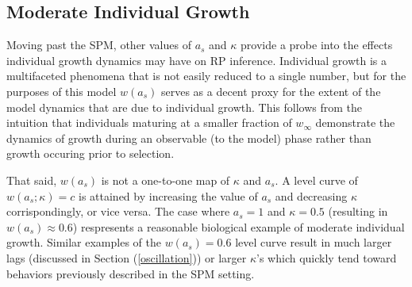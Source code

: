 %
\subsection{Moderate Individual Growth}

%
Moving past the SPM, other values of $a_s$ and $\kappa$ provide a probe into 
the effects individual growth dynamics may have on RP inference.
%
Individual growth is a multifaceted phenomena that is not easily reduced
to a single number, but for the purposes of this model $w(a_s)$ serves as a decent 
proxy for the extent of the model dynamics that are due to individual growth. %
%
This follows from the intuition that individuals maturing at a smaller fraction
of $w_\infty$ demonstrate the dynamics of growth during an observable (to the model) %
phase rather than growth occuring prior to selection. %

%
That said, $w(a_s)$ is not a one-to-one map of $\kappa$ and $a_s$.
%
A level curve of $w(a_s; \kappa)=c$ is attained by increasing the value of $a_s$
and decreasing $\kappa$ corrispondingly, or vice versa.
%
The case where $a_s=1$ and $\kappa=0.5$ (resulting in $w(a_s)\approx0.6$)
respresents a reasonable biological example of moderate individual growth.
%
Similar examples of the $w(a_s)=0.6$ level curve result in much larger lags
(discussed in Section (\ref{oscillation})) or larger $\kappa$'s which quickly
tend toward behaviors previously described in the SPM
setting.

